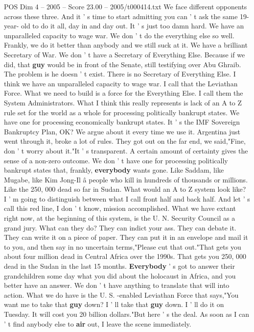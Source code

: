 \begin{textsample}{POS Dim 4 – 2005 – Score 23.00 – 2005/t000414.txt}
We face different opponents across these three.
And it ' s time to start admitting you can ' t ask the same 19-year- old to do it all, day in and day out.
It ' s just too damn hard.
We have an unparalleled capacity to wage war.
We don ' t do the everything else so well.
Frankly, we do it better than anybody and we still suck at it.
We have a brilliant Secretary of War.
We don ' t have a Secretary of Everything Else.
Because if we did, that \textbf{guy} would be in front of the Senate, still testifying over Abu Ghraib.
The problem is he doesn ' t exist.
There is no Secretary of Everything Else.
I think we have an unparalleled capacity to wage war.
I call that the Leviathan Force.
What we need to build is a force for the Everything Else.
I call them the System Administrators.
What I think this really represents is lack of an A to Z rule set for the world as a whole for processing politically bankrupt states.
We have one for processing economically bankrupt states.
It ' s the IMF Sovereign Bankruptcy Plan, OK?
We argue about it every time we use it.
Argentina just went through it, broke a lot of rules.
They got out on the far end, we said,"Fine, don ' t worry about it."It ' s transparent.
A certain amount of certainty gives the sense of a non-zero outcome.
We don ' t have one for processing politically bankrupt states that, frankly, \textbf{everybody} wants gone.
Like Saddam, like Mugabe, like Kim Jong-Il â people who kill in hundreds of thousands or millions.
Like the 250, 000 dead so far in Sudan.
What would an A to Z system look like?
I ' m going to distinguish between what I call front half and back half.
And let ' s call this red line, I don ' t know, mission accomplished.
What we have extant right now, at the beginning of this system, is the U.
N.
Security Council as a grand jury.
What can they do?
They can indict your ass.
They can debate it.
They can write it on a piece of paper.
They can put it in an envelope and mail it to you, and then say in no uncertain terms,"Please cut that out."That gets you about four million dead in Central Africa over the 1990s.
That gets you 250, 000 dead in the Sudan in the last 15 months. \textbf{Everybody} ' s got to answer their grandchildren some day what you did about the holocaust in Africa, and you better have an answer.
We don ' t have anything to translate that will into action.
What we do have is the U.
S. -enabled Leviathan Force that says,"You want me to take that \textbf{guy} down?
I ' ll take that \textbf{guy} down.
I ' ll do it on Tuesday.
It will cost you 20 billion dollars."But here ' s the deal.
As soon as I can ' t find anybody else to \textbf{air} out, I leave the scene immediately.

\end{textsample}
